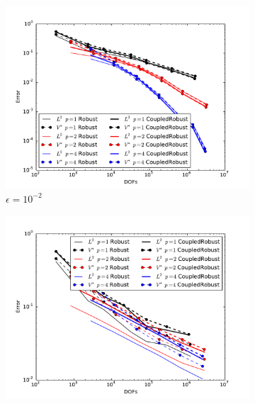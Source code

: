 \documentclass[Dissertation.tex]{subfiles}
\begin{document}

\begin{figure}[ht]
\centering
\begin{subfigure}[t]{0.45\textwidth}
\centering
\includegraphics[width=\textwidth]{Confusion/Robustness/convergence_epsilon=1e-2.pdf}
\caption{$\epsilon=10^{-2}$}
\end{subfigure}
\begin{subfigure}[t]{0.45\textwidth}
\centering
\includegraphics[width=\textwidth]{Confusion/Robustness/convergence_epsilon=1e-4.pdf}

\end{subfigure}
\end{figure}
\end{document}
